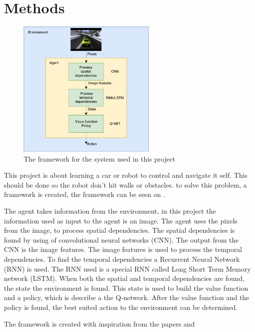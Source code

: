 \chapter{Methods}
\label{chap:projectdef}



\begin{figure}
	\centering
	\includegraphics[width=0.6\textwidth]{Figures/Architecture/Project_framework_diagram}
	\caption{The framework for the system used in this project}
	\label{fig:Project_framework}
\end{figure}
This project is about learning a car or robot to control and navigate it self. This should be done so the robot don't hit walls or obstacles. to solve this problem, a framework is created, the framework can be seen on .

The agent takes information from the environment, in this project the information used as input to the agent is an image. The agent uses the pixels from the image, to process spatial dependencies. The spatial dependencies is found by using of convolutional neural networks (CNN). The output from the CNN is the image features. The image features is used to process the temporal dependencies. To find the temporal dependencies a Recurrent Neural Network (RNN) is used. The RNN used is a special RNN called Long Short Term Memory network (LSTM). When both the spatial and temporal dependencies are found, the state the environment is found. This state is used to build the value function and a policy, which is describe a the Q-network. After the value function and the policy is found, the best suited action to the environment can be determined.


The framework is created with inspiration from the papers  \cite{DBLP:journals/corr/MnihBMGLHSK16} and \cite{Sallab:2017:2470-1173:70}
\newline








